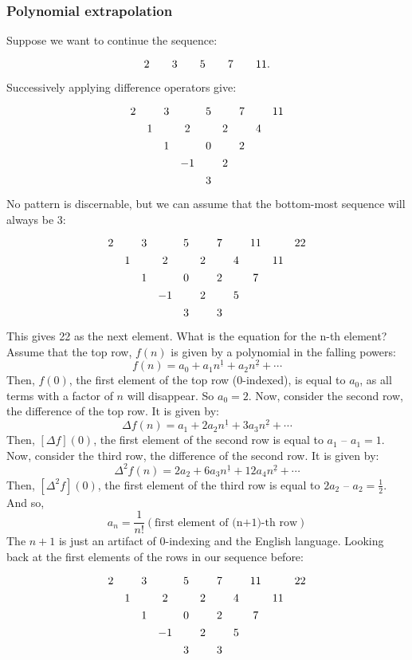 \documentclass{article}
\renewcommand\({\left(}
\renewcommand\){\right)}
\begin{document}
\subsubsection{Polynomial extrapolation}
Suppose we want to continue the sequence:
\[\def\arraystretch{1.3}
\begin{array}{cccccccccc}
    2& &3& &5& &7& &11.
\end{array}
\]
Successively applying difference operators give:
\[\def\arraystretch{1.3}
\begin{array}{cccccccccc}
    2& &3& &5& &7& &11\\
     &1& &2& &2& &4&\\
     & &1& &0& &2& &\\
     & & &-1& &2& & &\\
     & & & &3& & & &
\end{array}
\]
No pattern is discernable, but we can assume that the bottom-most sequence will always be 3:
\[\def\arraystretch{1.3}
\begin{array}{ccccccccccc}
    2& &3& &5& &7& &11& &22\\
     &1& &2& &2& &4& &11\\
     & &1& &0& &2& &7&\\
     & & &-1& &2& &5& &\\
     & & & &3& &3& & &\\
\end{array}
\]
This gives 22 as the next element. What is the equation for the n-th element? Assume that the top row, $f(n)$ is given by a polynomial in the falling powers:
\[f(n)=a_0+a_1n^{\underline{1}}+a_2n^{\underline{2}}+\cdots\]
Then, $f(0)$, the first element of the top row (0-indexed), is equal to $a_0$, as all terms with a factor of $n$ will disappear. So $a_0=2$. Now, consider the second row, the difference of the top row. It is given by:
\[\Delta f(n)=a_1+2a_2n^{\underline{1}}+3a_3n^{\underline{2}}+\cdots\]
Then, $[\Delta f](0)$, the first element of the second row is equal to $a_1$ -- $a_1=1$. Now, consider the third row, the difference of the second row. It is given by:
\[\Delta^2 f(n)=2a_2+6a_3n^{\underline{1}}+12a_4n^{\underline{2}}+\cdots\]
Then, $[\Delta^2 f](0)$, the first element of the third row is equal to $2a_2$ -- $a_2=\frac{1}{2}$. And so, \[a_n=\frac{1}{n!}\left(\text{first element of (n+1)-th row}\right)\]
The $n+1$ is just an artifact of 0-indexing and the English language.
Looking back at the first elements of the rows in our sequence before:
\[\def\arraystretch{1.3}
\begin{array}{ccccccccccc}
    2& &3& &5& &7& &11& &22\\
     &1& &2& &2& &4& &11\\
     & &1& &0& &2& &7&\\
     & & &-1& &2& &5& &\\
     & & & &3& &3& & &\\
\end{array}
\]
\end{document}
